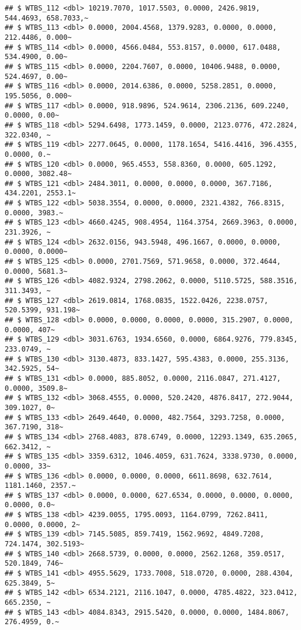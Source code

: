 \documentclass[
]{article}
\begin{document}
\begin{verbatim}
## $ WTBS_112 <dbl> 10219.7070, 1017.5503, 0.0000, 2426.9819, 544.4693, 658.7033,~
## $ WTBS_113 <dbl> 0.0000, 2004.4568, 1379.9283, 0.0000, 0.0000, 212.4486, 0.000~
## $ WTBS_114 <dbl> 0.0000, 4566.0484, 553.8157, 0.0000, 617.0488, 534.4900, 0.00~
## $ WTBS_115 <dbl> 0.0000, 2204.7607, 0.0000, 10406.9488, 0.0000, 524.4697, 0.00~
## $ WTBS_116 <dbl> 0.0000, 2014.6386, 0.0000, 5258.2851, 0.0000, 195.5056, 0.000~
## $ WTBS_117 <dbl> 0.0000, 918.9896, 524.9614, 2306.2136, 609.2240, 0.0000, 0.00~
## $ WTBS_118 <dbl> 5294.6498, 1773.1459, 0.0000, 2123.0776, 472.2824, 322.0340, ~
## $ WTBS_119 <dbl> 2277.0645, 0.0000, 1178.1654, 5416.4416, 396.4355, 0.0000, 0.~
## $ WTBS_120 <dbl> 0.0000, 965.4553, 558.8360, 0.0000, 605.1292, 0.0000, 3082.48~
## $ WTBS_121 <dbl> 2484.3011, 0.0000, 0.0000, 0.0000, 367.7186, 434.2201, 2553.1~
## $ WTBS_122 <dbl> 5038.3554, 0.0000, 0.0000, 2321.4382, 766.8315, 0.0000, 3983.~
## $ WTBS_123 <dbl> 4660.4245, 908.4954, 1164.3754, 2669.3963, 0.0000, 231.3926, ~
## $ WTBS_124 <dbl> 2632.0156, 943.5948, 496.1667, 0.0000, 0.0000, 0.0000, 0.0000~
## $ WTBS_125 <dbl> 0.0000, 2701.7569, 571.9658, 0.0000, 372.4644, 0.0000, 5681.3~
## $ WTBS_126 <dbl> 4082.9324, 2798.2062, 0.0000, 5110.5725, 588.3516, 311.3493, ~
## $ WTBS_127 <dbl> 2619.0814, 1768.0835, 1522.0426, 2238.0757, 520.5399, 931.198~
## $ WTBS_128 <dbl> 0.0000, 0.0000, 0.0000, 0.0000, 315.2907, 0.0000, 0.0000, 407~
## $ WTBS_129 <dbl> 3031.6763, 1934.6560, 0.0000, 6864.9276, 779.8345, 233.0749, ~
## $ WTBS_130 <dbl> 3130.4873, 833.1427, 595.4383, 0.0000, 255.3136, 342.5925, 54~
## $ WTBS_131 <dbl> 0.0000, 885.8052, 0.0000, 2116.0847, 271.4127, 0.0000, 3509.8~
## $ WTBS_132 <dbl> 3068.4555, 0.0000, 520.2420, 4876.8417, 272.9044, 309.1027, 0~
## $ WTBS_133 <dbl> 2649.4640, 0.0000, 482.7564, 3293.7258, 0.0000, 367.7190, 318~
## $ WTBS_134 <dbl> 2768.4083, 878.6749, 0.0000, 12293.1349, 635.2065, 662.3412, ~
## $ WTBS_135 <dbl> 3359.6312, 1046.4059, 631.7624, 3338.9730, 0.0000, 0.0000, 33~
## $ WTBS_136 <dbl> 0.0000, 0.0000, 0.0000, 6611.8698, 632.7614, 1181.1460, 2357.~
## $ WTBS_137 <dbl> 0.0000, 0.0000, 627.6534, 0.0000, 0.0000, 0.0000, 0.0000, 0.0~
## $ WTBS_138 <dbl> 4239.0055, 1795.0093, 1164.0799, 7262.8411, 0.0000, 0.0000, 2~
## $ WTBS_139 <dbl> 7145.5085, 859.7419, 1562.9692, 4849.7208, 724.1474, 302.5193~
## $ WTBS_140 <dbl> 2668.5739, 0.0000, 0.0000, 2562.1268, 359.0517, 520.1849, 746~
## $ WTBS_141 <dbl> 4955.5629, 1733.7008, 518.0720, 0.0000, 288.4304, 625.3849, 5~
## $ WTBS_142 <dbl> 6534.2121, 2116.1047, 0.0000, 4785.4822, 323.0412, 665.2350, ~
## $ WTBS_143 <dbl> 4084.8343, 2915.5420, 0.0000, 0.0000, 1484.8067, 276.4959, 0.~

\end{verbatim}
\end{document}
